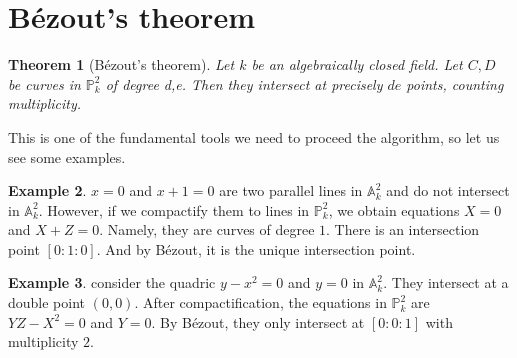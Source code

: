 \documentclass[a4paper,oneside,11pt]{article}
\newcommand{\bA}{\mathbb{A}}
\newcommand{\bP}{\mathbb{P}}
\newtheorem{thm}{Theorem}[section]
\theoremstyle{definition}
\newtheorem{eg}[thm]{Example}
\begin{document}
\section{B\'ezout's theorem}
\begin{thm}[B\'ezout's theorem]
	Let $k$ be an algebraically closed field. Let $C,D$ be curves in $\bP^2_k$ of degree d,e. Then they intersect at precisely $de$ points, counting multiplicity.
\end{thm}
This is one of the fundamental tools we need to proceed the algorithm, so let us see some examples.
\begin{eg}
	$x=0$ and $x+1=0$ are two parallel lines in $\bA^2_k$ and do not intersect in $\bA^2_k$. However, if we compactify them to lines in $\bP^2_k$, we obtain equations $X=0$ and $X+Z=0$. Namely, they are curves of degree $1$. There is an intersection point $[0:1:0]$. And by B\'ezout, it is the unique intersection point.
\end{eg}
\begin{eg}
	consider the quadric $y-x^2=0$ and $y=0$ in $\bA^2_k$. They intersect at a double point $(0,0)$. After compactification, the equations in $\bP^2_k$ are $YZ-X^2=0$ and $Y=0$. By B\'ezout, they only intersect at $[0:0:1]$ with multiplicity $2$.
\end{eg}
\end{document}
